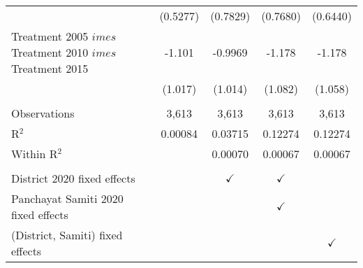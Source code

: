 \begin{tabular}{lcccc}
                                                                     & (0.5277)      & (0.7829)      & (0.7680)      & (0.6440)\\   
   Treatment 2005 $	imes $ Treatment  2010 $	imes $ Treatment 2015 & -1.101        & -0.9969       & -1.178        & -1.178\\   
                                                                     & (1.017)       & (1.014)       & (1.082)       & (1.058)\\   
    \\
   Observations                                                      & 3,613         & 3,613         & 3,613         & 3,613\\  
   R$^2$                                                             & 0.00084       & 0.03715       & 0.12274       & 0.12274\\  
   Within R$^2$                                                      &               & 0.00070       & 0.00067       & 0.00067\\  
    \\
   District 2020 fixed effects                                       &               & $\checkmark$  & $\checkmark$  & \\  
   Panchayat Samiti 2020 fixed effects                               &               &               & $\checkmark$  & \\  
   (District, Samiti) fixed effects                                  &               &               &               & $\checkmark$\\   
   \bottomrule
\end{tabular}
\par\endgroup


